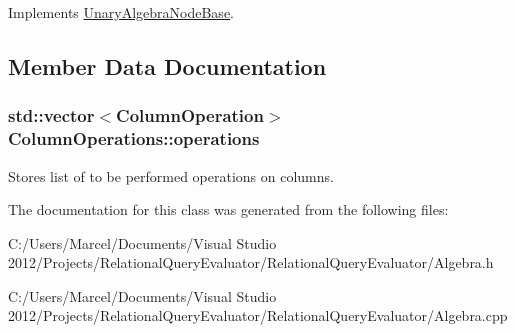 Implements \hyperlink{class_unary_algebra_node_base_a33355111a226cb460c9a13efaf922e32}{Unary\+Algebra\+Node\+Base}.



\subsection{Member Data Documentation}
\hypertarget{class_column_operations_a31aab19a9f8b104f772c111e920dd682}{
\subsubsection[{operations}]{\setlength{\rightskip}{0pt plus 5cm}std\+::vector$<${\bf Column\+Operation}$>$ Column\+Operations\+::operations}}\label{class_column_operations_a31aab19a9f8b104f772c111e920dd682}
Stores list of to be performed operations on columns. 

The documentation for this class was generated from the following files\+:\begin{DoxyCompactItemize}
\item 
C\+:/\+Users/\+Marcel/\+Documents/\+Visual Studio 2012/\+Projects/\+Relational\+Query\+Evaluator/\+Relational\+Query\+Evaluator/Algebra.\+h\item 
C\+:/\+Users/\+Marcel/\+Documents/\+Visual Studio 2012/\+Projects/\+Relational\+Query\+Evaluator/\+Relational\+Query\+Evaluator/Algebra.\+cpp\end{DoxyCompactItemize}
